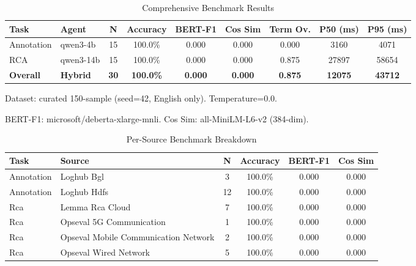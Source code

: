 
\begin{table}[h]
\centering
\caption{Comprehensive Benchmark Results}
\label{tab:comprehensive-results}
\begin{tabular}{llccccccc}
\toprule
\textbf{Task} & \textbf{Agent} & \textbf{N} & \textbf{Accuracy} & \textbf{BERT-F1} & \textbf{Cos Sim} & \textbf{Term Ov.} & \textbf{P50 (ms)} & \textbf{P95 (ms)} \\
\midrule
Annotation & qwen3-4b & 15 & 100.0\% & 0.000 & 0.000 & 0.000 & 3160 & 4071 \\
RCA & qwen3-14b & 15 & 100.0\% & 0.000 & 0.000 & 0.875 & 27897 & 58654 \\
\midrule
\textbf{Overall} & \textbf{Hybrid} & \textbf{30} & \textbf{100.0\%} & \textbf{0.000} & \textbf{0.000} & \textbf{0.875} & \textbf{12075} & \textbf{43712} \\
\bottomrule
\end{tabular}
\begin{tablenotes}
\small
\item Dataset: curated 150-sample (seed=42, English only). Temperature=0.0.
\item BERT-F1: microsoft/deberta-xlarge-mnli. Cos Sim: all-MiniLM-L6-v2 (384-dim).
\end{tablenotes}
\end{table}


\begin{table}[h]
\centering
\caption{Per-Source Benchmark Breakdown}
\label{tab:per-source}
\begin{tabular}{llcccc}
\toprule
\textbf{Task} & \textbf{Source} & \textbf{N} & \textbf{Accuracy} & \textbf{BERT-F1} & \textbf{Cos Sim} \\
\midrule
Annotation & Loghub Bgl & 3 & 100.0\% & 0.000 & 0.000 \\
Annotation & Loghub Hdfs & 12 & 100.0\% & 0.000 & 0.000 \\
Rca & Lemma Rca Cloud & 7 & 100.0\% & 0.000 & 0.000 \\
Rca & Opseval 5G Communication & 1 & 100.0\% & 0.000 & 0.000 \\
Rca & Opseval Mobile Communication Network & 2 & 100.0\% & 0.000 & 0.000 \\
Rca & Opseval Wired Network & 5 & 100.0\% & 0.000 & 0.000 \\
\bottomrule
\end{tabular}
\end{table}


